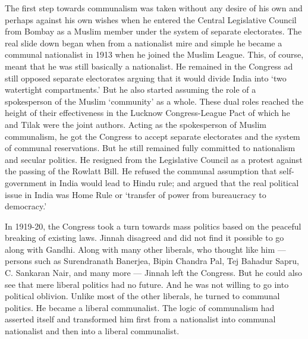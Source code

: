 The first step towards communalism was taken without any desire of his own and perhaps against his own wishes when he entered the Central Legislative Council from Bombay as a Muslim member under the system of separate electorates. The real slide down began when from a nationalist mire and simple he became a communal nationalist in 1913 when he joined the Muslim League. This, of course, meant that he was still basically a nationalist. He remained in the Congress ad still opposed separate electorates arguing that it would divide India into `two watertight compartments.' But he also started assuming the role of a spokesperson of the Muslim `community' as a whole. These dual roles reached the height of their effectiveness in the Lucknow Congress-League Pact of which he and Tilak were the joint authors. Acting as the spokesperson of Muslim communalism, he got the Congress to accept separate electorates and the system of communal reservations. But he still remained fully committed to nationalism and secular politics. He resigned from the Legislative Council as a protest against the passing of the Rowlatt Bill. He refused the communal assumption that self- government in India would lead to Hindu rule; and argued that the real political issue in India was Home Rule or `transfer of power from bureaucracy to democracy.' 

In 1919-20, the Congress took a turn towards mass politics based on the peaceful breaking of existing laws. Jinnah disagreed and did not find it possible to go along with Gandhi. Along with many other liberals, who thought like him — persons such as Surendranath Banerjea, Bipin Chandra Pal, Tej Bahadur Sapru, C. Sankaran Nair, and many more — Jinnah left the Congress. But he could also see that mere liberal politics had no future. And he was not willing to go into political oblivion. Unlike most of the other liberals, he turned to communal politics. He became a liberal communalist. The logic of communalism had asserted itself and transformed him first from a nationalist into communal nationalist and then into a liberal communalist. 

